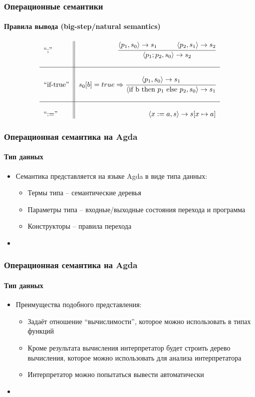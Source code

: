 \documentclass[10pt,pdf,hyperref={unicode}]{beamer}
\begin{document}
      \begin{frame}
         \frametitle{Операционные семантики}
         \framesubtitle{Правила вывода (big-step/natural semantics)}

         \begin{align*}
            \begin{tabular}{l || r}
               ``;''       & $\seqns$    \\
               \\ \hline \\
               ``if-true'' & $\iftruens$ \\
               \\ \hline \\
               ``:=''      & $\assignns$ \\
            \end{tabular}
         \end{align*}
      \end{frame}

      \begin{frame}
         \frametitle{Операционная семантика на Agda}
         \framesubtitle{Тип данных}
         \begin{itemize}
            \item Семантика представляется на языке Agda в виде типа данных:
            \begin{itemize}
               \item Термы типа -- семантические деревья
               \item Параметры типа -- входные/выходные состояния перехода и программа
               \item Конструкторы -- правила перехода
            \end{itemize}
            \item[] \small{}
         \end{itemize}
      \end{frame}

      \begin{frame}
         \frametitle{Операционная семантика на Agda}
         \framesubtitle{Тип данных}
         \begin{itemize}
            \item Преимущества подобного представления:
            \begin{itemize}
               \item Задаёт отношение ``вычислимости'', которое можно использовать в типах функций
               \item Кроме результата вычисления интерпретатор будет строить дерево вычисления,
                     которое можно использовать для анализа интерпретатора
               \item Интерпретатор можно попытаться вывести автоматически
            \end{itemize}
            \item[] \small{}
         \end{itemize}
      \end{frame}
\end{document}
